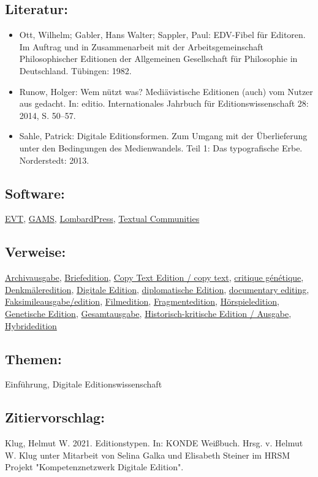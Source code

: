 \documentclass{article}
\begin{document}
        \subsection*{Literatur:}\begin{itemize}\item Ott, Wilhelm; Gabler, Hans Walter; Sappler, Paul: EDV-Fibel für Editoren. Im Auftrag und in Zusammenarbeit mit der Arbeitsgemeinschaft Philosophischer Editionen der Allgemeinen Gesellschaft für Philosophie in Deutschland. Tübingen: 1982.\item Runow, Holger: Wem nützt was? Mediävistische Editionen (auch) vom Nutzer aus gedacht. In: editio. Internationales Jahrbuch für Editionswissenschaft 28: 2014, S. 50–57.\item Sahle, Patrick: Digitale Editionsformen. Zum Umgang mit der Überlieferung unter den Bedingungen des Medienwandels. Teil 1: Das typografische Erbe. Norderstedt: 2013.\end{itemize}\subsection*{Software:}\href{http://evt.labcd.unipi.it/}{EVT}, \href{http://gams.uni-graz.at/archive/objects/o:gams.doku/methods/sdef:TEI/get?locale=de}{GAMS}, \href{http://lombardpress.org/}{LombardPress}, \href{https://textualcommunities.org/app/}{Textual Communities}\subsection*{Verweise:}\href{https://gams.uni-graz.at/o:konde.33}{Archivausgabe}, \href{https://gams.uni-graz.at/o:konde.39}{Briefedition}, \href{https://gams.uni-graz.at/o:konde.43}{Copy Text Edition / copy text}, \href{https://gams.uni-graz.at/o:konde.46}{critique génétique}, \href{https://gams.uni-graz.at/o:konde.55}{Denkmäleredition}, \href{https://gams.uni-graz.at/o:konde.59}{Digitale Edition}, \href{https://gams.uni-graz.at/o:konde.65}{diplomatische Edition}, \href{https://gams.uni-graz.at/o:konde.72}{documentary editing}, \href{https://gams.uni-graz.at/o:konde.83}{Faksimileausgabe/edition}, \href{https://gams.uni-graz.at/o:konde.85}{Filmedition}, \href{https://gams.uni-graz.at/o:konde.88}{Fragmentedition}, \href{https://gams.uni-graz.at/o:konde.95}{Hörspieledition}, \href{https://gams.uni-graz.at/o:konde.90}{Genetische Edition}, \href{https://gams.uni-graz.at/o:konde.91}{Gesamtausgabe}, \href{https://gams.uni-graz.at/o:konde.93}{Historisch-kritische Edition / Ausgabe}, \href{https://gams.uni-graz.at/o:konde.96}{Hybridedition}\subsection*{Themen:}Einführung, Digitale Editionswissenschaft\subsection*{Zitiervorschlag:}Klug, Helmut W. 2021. Editionstypen. In: KONDE Weißbuch. Hrsg. v. Helmut W. Klug unter Mitarbeit von Selina Galka und Elisabeth Steiner im HRSM Projekt "Kompetenznetzwerk Digitale Edition". 
\end{document}
